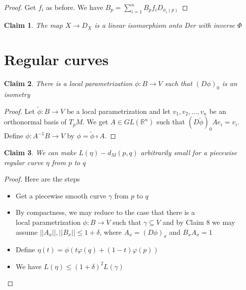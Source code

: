 \documentclass{article}
\newtheorem{claim}{Claim}
\begin{document}
\begin{proof}
    Get $f_i$ as before. We have $B_p = \sum_{i=1}^{n} B_p f_i D_{\phi_i(p)}$
\end{proof}

\begin{claim}
    The map $X \to D_X$ is a linear isomorphism onto Der with inverse $\Phi$
\end{claim}

\section{Regular curves}

\begin{claim}
    There is a local parametrization $\phi: B \to V$ such that $(D\phi)_0$ is an isometry
\end{claim}

\begin{proof}
    Let $\tilde{\phi}: B \to V$ be a local parametrization and let $v_1,v_2,\dots,v_n$ be an orthonormal basis of $T_pM$. We get $A \in GL(\mathbb{R}^n)$ such that $(D\tilde{\phi})_0Ae_i=v_i$. Define $\phi: A^{-1}B \to V$ by $\phi = \tilde{\phi} \circ A$.
\end{proof}

\begin{claim}
    We can make $L(\eta) - d_M(p,q) $ arbitrarily small for a piecewise regular curve $\eta$ from $p$ to $q$  
\end{claim}

\begin{proof} Here are the steps
    \begin{itemize}
        \item Get a piecewise smooth curve $\gamma$ from $p$ to $q$ 
        
        \item By compactness, we may reduce to the case that there is a \\ local parametrization $\phi: B \to V$ such that $\gamma \subseteq V$ and by Claim 8 we may assume $||A_x||,||B_x|| \leq 1 +\delta$, where $A_x = (D\phi)_x$ and $B_x A_x=1$
        
        \item Define $\eta(t)= \phi(t\varphi(q)+(1-t)\varphi(p))$
        
        \item We have $L(\eta) \leq (1+\delta)^2 L(\gamma)$
    \end{itemize}
    
\end{proof}
\end{document}
